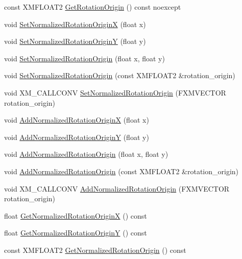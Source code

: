 \begin{DoxyCompactItemize}
\item 
const X\+M\+F\+L\+O\+A\+T2 \hyperlink{structmage_1_1_sprite_transform_aa7a6f3cad38ed9231455de722e60040c}{Get\+Rotation\+Origin} () const noexcept
\item 
void \hyperlink{structmage_1_1_sprite_transform_a9238ea8161534b8382076296dcbbb957}{Set\+Normalized\+Rotation\+OriginX} (float x)
\item 
void \hyperlink{structmage_1_1_sprite_transform_aee42a4fb1af7259fa0ee9116e43ba952}{Set\+Normalized\+Rotation\+OriginY} (float y)
\item 
void \hyperlink{structmage_1_1_sprite_transform_af38d3258ab8269405487fc8e1f7c861d}{Set\+Normalized\+Rotation\+Origin} (float x, float y)
\item 
void \hyperlink{structmage_1_1_sprite_transform_a8cb44224f42f9b7811b39427c2745b3f}{Set\+Normalized\+Rotation\+Origin} (const X\+M\+F\+L\+O\+A\+T2 \&rotation\+\_\+origin)
\item 
void X\+M\+\_\+\+C\+A\+L\+L\+C\+O\+NV \hyperlink{structmage_1_1_sprite_transform_a820e4d9bcfaf0a66b325c5229c06de78}{Set\+Normalized\+Rotation\+Origin} (F\+X\+M\+V\+E\+C\+T\+OR rotation\+\_\+origin)
\item 
void \hyperlink{structmage_1_1_sprite_transform_a8051d03c7bb8d634c5a2b62efc1f14b0}{Add\+Normalized\+Rotation\+OriginX} (float x)
\item 
void \hyperlink{structmage_1_1_sprite_transform_acff839babfd83b886607a1fdc5e8ec93}{Add\+Normalized\+Rotation\+OriginY} (float y)
\item 
void \hyperlink{structmage_1_1_sprite_transform_ae29df058ce19f7be2ab03092d8e3b746}{Add\+Normalized\+Rotation\+Origin} (float x, float y)
\item 
void \hyperlink{structmage_1_1_sprite_transform_a40a99b8114f448717ce1f7c7644ea6ee}{Add\+Normalized\+Rotation\+Origin} (const X\+M\+F\+L\+O\+A\+T2 \&rotation\+\_\+origin)
\item 
void X\+M\+\_\+\+C\+A\+L\+L\+C\+O\+NV \hyperlink{structmage_1_1_sprite_transform_a5571cc3e5700aba23f8c229675f10c3e}{Add\+Normalized\+Rotation\+Origin} (F\+X\+M\+V\+E\+C\+T\+OR rotation\+\_\+origin)
\item 
float \hyperlink{structmage_1_1_sprite_transform_a1122781a24349c230e9f183197a170d8}{Get\+Normalized\+Rotation\+OriginX} () const
\item 
float \hyperlink{structmage_1_1_sprite_transform_a056e5e5ecfaa79a2ff57ce7ec9e47a30}{Get\+Normalized\+Rotation\+OriginY} () const
\item 
const X\+M\+F\+L\+O\+A\+T2 \hyperlink{structmage_1_1_sprite_transform_aae811b88ac3cbd5ac18c67ddd81bef99}{Get\+Normalized\+Rotation\+Origin} () const

\end{DoxyCompactItemize}
